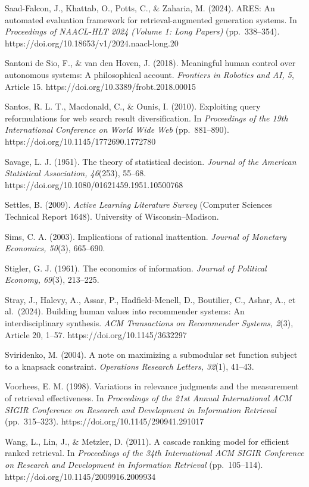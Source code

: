 \documentclass[
  11pt]{article}
\begin{document}
Saad-Falcon, J., Khattab, O., Potts, C., \& Zaharia, M. (2024). ARES: An
automated evaluation framework for retrieval-augmented generation
systems. In \emph{Proceedings of NAACL-HLT 2024 (Volume 1: Long Papers)}
(pp.~338--354). https://doi.org/10.18653/v1/2024.naacl-long.20

Santoni de Sio, F., \& van den Hoven, J. (2018). Meaningful human
control over autonomous systems: A philosophical account.
\emph{Frontiers in Robotics and AI, 5}, Article 15.
https://doi.org/10.3389/frobt.2018.00015

Santos, R. L. T., Macdonald, C., \& Ounis, I. (2010). Exploiting query
reformulations for web search result diversification. In
\emph{Proceedings of the 19th International Conference on World Wide
Web} (pp.~881--890). https://doi.org/10.1145/1772690.1772780

Savage, L. J. (1951). The theory of statistical decision. \emph{Journal
of the American Statistical Association, 46}(253), 55--68.
https://doi.org/10.1080/01621459.1951.10500768

Settles, B. (2009). \emph{Active Learning Literature Survey} (Computer
Sciences Technical Report 1648). University of Wisconsin--Madison.

Sims, C. A. (2003). Implications of rational inattention. \emph{Journal
of Monetary Economics, 50}(3), 665--690.

Stigler, G. J. (1961). The economics of information. \emph{Journal of
Political Economy, 69}(3), 213--225.

Stray, J., Halevy, A., Assar, P., Hadfield-Menell, D., Boutilier, C.,
Ashar, A., et al.~(2024). Building human values into recommender
systems: An interdisciplinary synthesis. \emph{ACM Transactions on
Recommender Systems, 2}(3), Article 20, 1--57.
https://doi.org/10.1145/3632297

Sviridenko, M. (2004). A note on maximizing a submodular set function
subject to a knapsack constraint. \emph{Operations Research Letters,
32}(1), 41--43.

Voorhees, E. M. (1998). Variations in relevance judgments and the
measurement of retrieval effectiveness. In \emph{Proceedings of the 21st
Annual International ACM SIGIR Conference on Research and Development in
Information Retrieval} (pp.~315--323).
https://doi.org/10.1145/290941.291017

Wang, L., Lin, J., \& Metzler, D. (2011). A cascade ranking model for
efficient ranked retrieval. In \emph{Proceedings of the 34th
International ACM SIGIR Conference on Research and Development in
Information Retrieval} (pp.~105--114).
https://doi.org/10.1145/2009916.2009934
\end{document}
